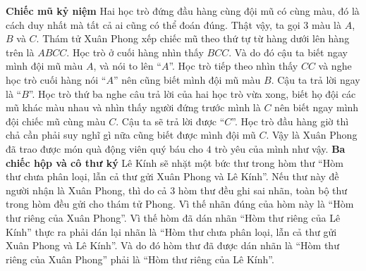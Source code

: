 \vskip 0.1cm
\textbf{\color{gocco}Chiếc mũ kỷ niệm} 
\vskip 0.1cm
Hai học trò đứng đầu hàng cùng đội mũ có cùng màu, đó là cách duy nhất mà tất cả ai cũng có thể đoán đúng.
\vskip 0.1cm
Thật vậy, ta gọi $3$ màu là $A$, $B$ và $C$. Thám tử Xuân Phong xếp chiếc mũ theo thứ tự từ hàng dưới lên hàng trên là $ABCC$. Học trò ở cuối hàng nhìn thấy $BCC$. Và do đó cậu ta biết ngay mình đội mũ màu $A$, và nói to lên “$A$”.
\vskip 0.1cm
Học trò tiếp theo nhìn thấy $CC$ và nghe học trò cuối hàng nói “$A$” nên cũng biết mình đội mũ màu $B$. Cậu ta trả lời ngay là “$B$”.
\vskip 0.1cm
Học trò thứ ba nghe câu trả lời của hai học trò vừa xong, biết họ đội các mũ khác màu nhau và nhìn thấy người đứng trước mình là $C$ nên biết ngay mình đội chiếc mũ cùng màu $C$. Cậu ta sẽ trả lời được “$C$”.
\vskip 0.1cm
Học  trò đầu hàng giờ thì chả cần phải suy nghĩ gì nữa cũng biết được mình đội mũ $C$. Vậy là Xuân Phong đã trao được món quà động viên quý báu cho $4$ trò yêu của mình như vậy.
\vskip 0.1cm
\textbf{\color{toanhocdoisong}Ba chiếc hộp và cô thư ký}
\vskip 0.1cm
Lê Kính sẽ nhặt một bức thư trong hòm thư “Hòm thư chưa phân loại, lẫn cả thư gửi Xuân Phong và Lê Kính”. Nếu thư này đề người nhận là Xuân Phong, thì do cả $3$ hòm thư đều ghi sai nhãn, toàn bộ thư trong hòm đều gửi cho thám tử Phong. Vì thế nhãn đúng của hòm này là “Hòm thư riêng của Xuân Phong”.
\vskip 0.1cm
Vì thế hòm đã dán nhãn “Hòm thư riêng của Lê Kính” thực ra phải dán lại nhãn là “Hòm thư chưa phân loại, lẫn cả thư gửi Xuân Phong và Lê Kính”.
\vskip 0.1cm
Và do đó hòm thư đã được dán nhãn là “Hòm thư riêng của Xuân Phong” phải là “Hòm thư riêng của Lê Kính”.
\vskip 0.1cm

